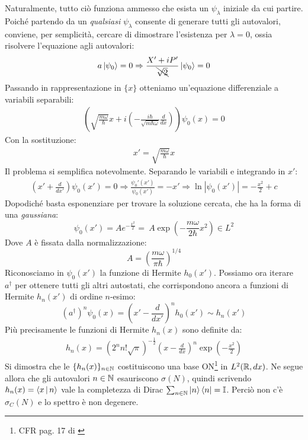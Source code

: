 \documentclass[../../FisicaTeorica.tex]{subfiles}
\begin{document}
Naturalmente, tutto ciò funziona ammesso che esista un $\psi_\lambda$ iniziale da cui partire. Poiché partendo da un \textit{qualsiasi} $\psi_\lambda$ consente di generare tutti gli autovalori, conviene, per semplicità, cercare di dimostrare l'esistenza per $\lambda=0$, ossia risolvere l'equazione agli autovalori:
\begin{align*}
a\Ket{\psi_0} = 0 \Rightarrow \frac{X'+iP'}{\bcancel{\sqrt{2}}} \Ket{\psi_0} = 0
\end{align*}
Passando in rappresentazione in $\{x\}$ otteniamo un'equazione differenziale a variabili separabili:
\begin{align*}
\left(\sqrt{\frac{m\omega}{\hbar}}
x+i\left(-\frac{i\hbar}{\sqrt{m\hbar \omega}}\frac{d}{dx} \right)
\right)\psi_0(x) =0
\end{align*}
Con la sostituzione:
\begin{align*}
x'=\sqrt{\frac{m\omega}{\hbar}}x
\end{align*}
Il problema si semplifica notevolmente. Separando le variabili e integrando in $x'$:
\begin{align*}
\left(x'+\frac{d}{dx'}\right)\psi_0 (x') = 0 \Rightarrow \frac{\psi_0'(x')}{\psi_0(x')}=-x' \Rightarrow \ln|\psi_0(x')|=-\frac{x^2}{2}+c
\end{align*}
Dopodiché basta esponenziare per trovare la soluzione cercata, che ha la forma di una \textit{gaussiana}:
\[
\psi_0(x') = Ae^{-\frac{x^2}{2}} =\ A \exp\left(-\frac{m\omega}{2\hbar}x^2\right) \in L^2
\]
Dove $A$ è fissata dalla normalizzazione:
\[
A = \left(\frac{m\omega}{\pi \hbar}\right)^{1/4}
\]
Riconosciamo in $\psi_0(x')$ la funzione di Hermite $h_0(x')$. Possiamo ora iterare  $a^\dag$ per ottenere tutti gli altri autostati, che corrispondono ancora a funzioni di Hermite $h_n(x')$ di ordine $n$-esimo:
\[
(a^\dag)^n \psi_0(x) = \left(x'-\frac{d}{dx'}\right)^n h_0(x') \sim h_n(x')
\]
Più precisamente le funzioni di Hermite $h_n(x)$ sono definite da:
\begin{align*}
    h_n(x) = \left(2^n n! \sqrt{\pi}\right)^{-\frac{1}{2}}\left( x - \frac{d}{dx}\right)^n \exp\left(-\frac{x^2}{2}\right)
\end{align*}
Si dimostra che le $\{h_n(x)\}_{n\in \mathbb{N}}$ costituiscono una base ON\footnote{CFR pag. 17 di \cite{spazi_hilbert}} in $L^2(\mathbb{R},dx)$. Ne segue allora che gli autovalori $n\in \mathbb{N}$ esauriscono $\sigma(N)$, quindi scrivendo $h_n(x)=\Braket{x|n}$ vale la completezza di Dirac $\sum_{n\in \mathbb{N}}\Ket{n}\Bra{n}=\mathbb{I}$. Perciò non c'è $\sigma_C(N)$ e lo spettro è non degenere.\\
\end{document}
